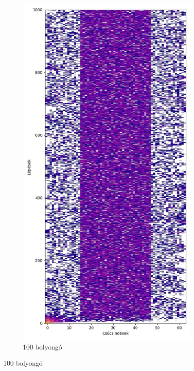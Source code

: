 \begin{figure}[H]
  \centering
  \begin{subfigure}{.40\linewidth}
    \centering
    \includegraphics[width=\linewidth]{./figures/ragasztott_binaris/sim02.jpg}
    \caption{100 bolyongó}

\end{subfigure}
\end{figure}
